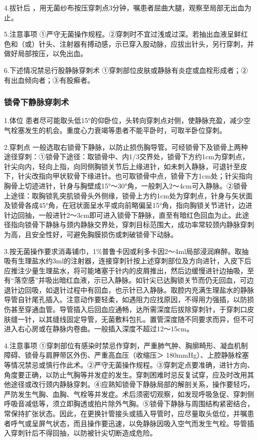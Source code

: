 4.拔针后
，用无菌纱布按压穿刺点3分钟，嘱患者屈曲大腿，观察至局部无出血为止。

5.注意事项
①严守无菌操作规程。②穿刺时不宜过浅或过深。若抽出血液呈鲜红色和（或）针头、注射器有搏动感，示已穿入股动脉，应拔出针头，另行穿刺，并做好局部按压，以免出血。

6.下述情况禁忌行股静脉穿刺术
①穿刺部位皮肤或静脉有炎症或血栓形成者；②有出血倾向者；③有股癣者。

\subsubsection{锁骨下静脉穿刺术}

1.体位
患者尽可能取头低15°的仰卧位，头转向穿刺点对侧，使静脉充盈，减少空气栓塞发生的机会。重度心力衰竭等患者不能平卧时，可取半卧位穿刺。

2.穿刺点
一般选取右锁骨下静脉，以防止损伤胸导管。可经锁骨下及锁骨上两种途径穿刺：①锁骨下途径：取锁骨中、内1/3交界处，锁骨下方约1cm为穿刺点，针尖向内，轻向上指，向同侧胸锁关节后上缘进针，如未刺入静脉，可退针至皮下，针尖改指向甲状软骨下缘进针。也可取锁骨中点，锁骨下方1cm处；针尖指向胸骨上切迹进针，针身与胸壁成15°～30°角，一般刺入2～4cm可入静脉。②锁骨上途径：取胸锁乳突肌锁骨头外侧缘，锁骨上方约1cm处为穿刺点，针身与矢状面及锁骨各成45°角，在冠状面呈水平或向前略偏呈15°角，指向胸锁关节进针，边进针边回抽，一般进针2～3cm即可进入锁骨下静脉，直至有暗红色回血为止。此途径指向锁骨下静脉与颈内静脉交界处，穿刺目标范围大，成功率常较颈内静脉穿刺为高，且安全性好，可避免胸膜损伤或刺破锁骨下动脉。

3.按无菌操作要求消毒铺巾，1\%普鲁卡因或利多卡因2～4ml局部浸润麻醉。取抽吸有生理盐水约3ml的注射器，连接穿刺针按上述穿刺部位及方向进针，入皮下后应推注少量生理盐水，将可能堵塞于针内的皮屑推出，然后边缓慢进针边抽吸，至有“落空感”并吸出暗红血液，示已入静脉。如针尖已达胸锁关节而仍无回血，可边退针边回吸，如退针过程中有回血，也示针已入静脉。取腔内充满生理盐水的静脉导管自针尾孔插入。注意动作要轻柔，如遇阻力应找原因，不得用力强插，以防损伤甚至穿通血管。导管插入后回血应通畅，达所需深度后拔除穿刺针，于穿刺口皮肤缝一针，以其缝线固定导管，无菌敷料包扎。置管深度随不同要求而异，但不可进入右心房或在静脉内卷曲。一般插入深度不超过12～15cm。

4.注意事项
①穿刺部位有感染时禁忌作穿刺，严重肺气肿、胸廓畸形、凝血机制障碍、锁骨与肩胛带区外伤、严重高血压（收缩压＞
180mmHg）、上腔静脉栓塞等情况禁忌或慎行作此术。②严守无菌操作规程。③穿刺定点要准确，进针方向、角度要正确，以防止气胸等并发症的发生。穿刺困难时忌反复试穿，应及时改用其他途径或改行颈内静脉穿刺。④应熟知锁骨下静脉局部的解剖关系，操作要轻巧，严防发生气胸、血胸、气栓等并发症。术后须密切观察，如发现呼吸急促、穿刺侧呼吸音减低等，须立即胸透或拍片除外气胸。⑤锁骨下静脉与周围结构紧密结合，常保持扩张状态。因此，在更换针管接头或插入导管时，应尽量取头低位，并嘱患者呼气或呈屏气状态，而且操作要迅速，以免静脉因吸入空气而发生气栓。导管插入穿刺针后不得回抽，以防被针尖切断造成危险。

